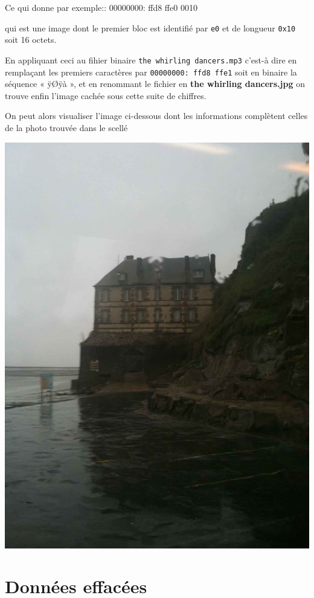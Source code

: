 \documentclass[a4paper,11pt]{article}
\begin{document}
Ce qui donne par exemple:: 
    00000000: ffd8 ffe0 0010

    qui est une image dont le premier bloc est identifié par {\tt e0} et de longueur {\tt 0x10} soit
16 octets.

En appliquant ceci au fihier binaire {\tt the whirling dancers.mp3}
c'est-à dire en remplaçant les premiers caractères par {\tt 00000000: ffd8 ffe1} soit en binaire
la séquence « ÿØÿà », et en renommant le fichier en {\bf the whirling dancers.jpg} on trouve
enfin l'image cachée sous cette suite de chiffres.

On peut alors visualiser l'image ci-dessous dont les informations complètent celles de la
photo trouvée dans le scellé
 
\includegraphics[width=\textwidth]{thewhirlingdancers.jpg}

\section{Données effacées}
\end{document}
